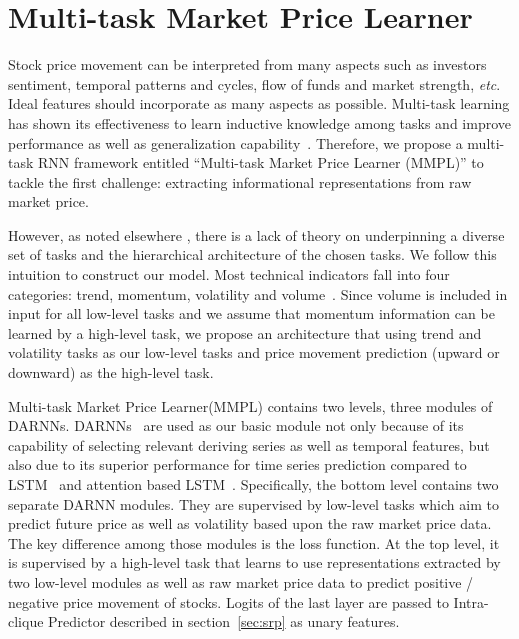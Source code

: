 \section{Multi-task Market Price Learner}
\label{sec:mmpl}

Stock price movement can be interpreted from many aspects such as
investors sentiment, temporal patterns and cycles, flow of funds
and market strength, \textit{etc}. Ideal features should
incorporate as many aspects as possible. Multi-task learning
has shown its effectiveness to learn inductive knowledge among
tasks and improve performance as well as generalization
capability~\cite{caruana1993multitask}. Therefore, we propose a
multi-task RNN framework entitled ``Multi-task Market Price
Learner (MMPL)'' to tackle the first challenge: extracting
informational representations from raw market price.

However, as noted elsewhere
\cite{caruana1993multitask,ruder2017overview}, there is a lack of
theory on underpinning a diverse set of tasks and the
hierarchical architecture of the chosen tasks. We follow this
intuition to construct our model. Most technical indicators fall
into four categories: trend, momentum, volatility and
volume~\cite{kirkpatrick2010technical}. Since volume is included
in input for all low-level tasks and we assume that momentum
information can be learned by a high-level task, we propose an
architecture that using trend and volatility tasks as our low-level tasks and price movement prediction (upward or downward) as
the high-level task.


Multi-task Market Price Learner(MMPL) contains two
levels, three modules of DARNNs. DARNNs~\cite{qin2017dual} are
used as our basic module not only because of its capability of
selecting relevant deriving series as well as temporal features,
but also due to its superior performance for time series
prediction compared to LSTM~\cite{hochreiter1997long} and
attention based LSTM~\cite{attention}. Specifically, the bottom
level contains two separate DARNN modules. They are supervised by
low-level tasks which aim to predict future price as well as
volatility based upon the raw market price data. The key
difference among those modules is the loss function. At the top
level, it is supervised by a high-level task that learns to use
representations extracted by two low-level modules as well as raw
market price data to predict positive / negative price movement
of stocks. Logits of the last layer are passed to Intra-clique
Predictor described in section~\ref{sec:srp} as unary features.

